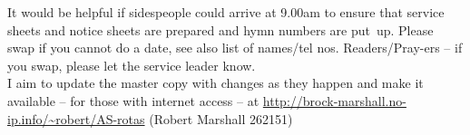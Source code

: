 \documentclass[10pt]{article}
\begin{document}
\begin{minipage}{0.65\textwidth}
{\footnotesize It would be helpful if sidespeople 
could arrive at 9.00am to ensure that service sheets and notice sheets are 
prepared and hymn numbers are put~up.
Please swap if you cannot do a date, see also list of names/tel nos.
Readers/Pray-ers -- if you swap, please let the service leader know.\\
I aim to update the master copy with changes as they
happen and make it available -- for those with internet access
\linebreak -- at
\url{http://brock-marshall.no-ip.info/~robert/AS-rotas}
(Robert Marshall 262151)}
\end{minipage}
\hspace{1.5em}
\begin{minipage}{0.3\textwidth}
\ifpdf
\else
\hspace{0.5em}
\fi
\end{minipage}
\end{document}
